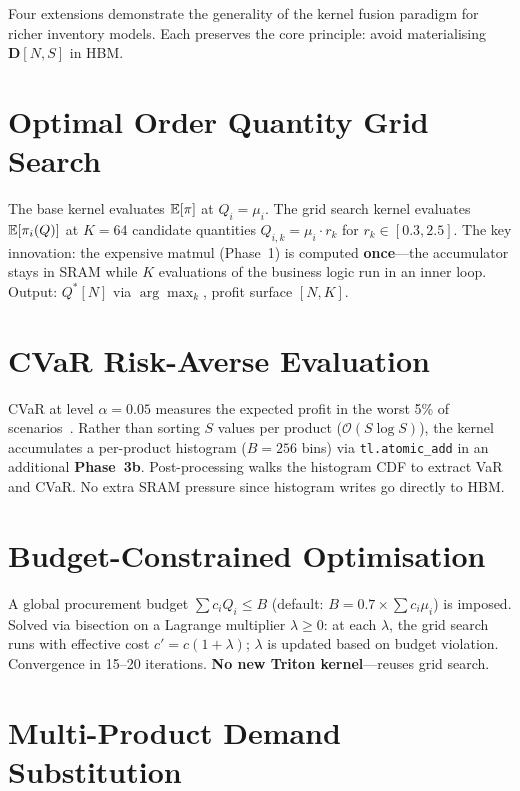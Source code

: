 Four extensions demonstrate the generality of the kernel fusion paradigm for richer inventory models. Each preserves the core principle: avoid materialising $\mathbf{D}[N,S]$ in HBM.

\section{Optimal Order Quantity Grid Search}\label{sec:ext-grid}

The base kernel evaluates $\mathbb{E}[\pi]$ at $Q_i = \mu_i$. The grid search kernel evaluates $\mathbb{E}[\pi_i(Q)]$ at $K{=}64$ candidate quantities $Q_{i,k} = \mu_i \cdot r_k$ for $r_k \in [0.3, 2.5]$. The key innovation: the expensive matmul (Phase~1) is computed \textbf{once}---the accumulator stays in SRAM while $K$ evaluations of the business logic run in an inner loop. Output: $Q^*[N]$ via $\arg\max_k$, profit surface $[N, K]$.

\section{CVaR Risk-Averse Evaluation}\label{sec:ext-cvar}

CVaR at level $\alpha{=}0.05$ measures the expected profit in the worst 5\% of scenarios~\citep{rockafellar2000}. Rather than sorting $S$ values per product ($\mathcal{O}(S\log S)$), the kernel accumulates a per-product histogram ($B{=}256$ bins) via \texttt{tl.atomic\_add} in an additional \textbf{Phase~3b}. Post-processing walks the histogram CDF to extract VaR and CVaR. No extra SRAM pressure since histogram writes go directly to HBM.

\section{Budget-Constrained Optimisation}\label{sec:ext-budget}

A global procurement budget $\sum c_i Q_i \leq B$ (default: $B = 0.7 \times \sum c_i \mu_i$) is imposed. Solved via bisection on a Lagrange multiplier $\lambda \geq 0$: at each $\lambda$, the grid search runs with effective cost $c' = c(1+\lambda)$; $\lambda$ is updated based on budget violation. Convergence in 15--20 iterations. \textbf{No new Triton kernel}---reuses grid search.

\section{Multi-Product Demand Substitution}\label{sec:ext-sub}

